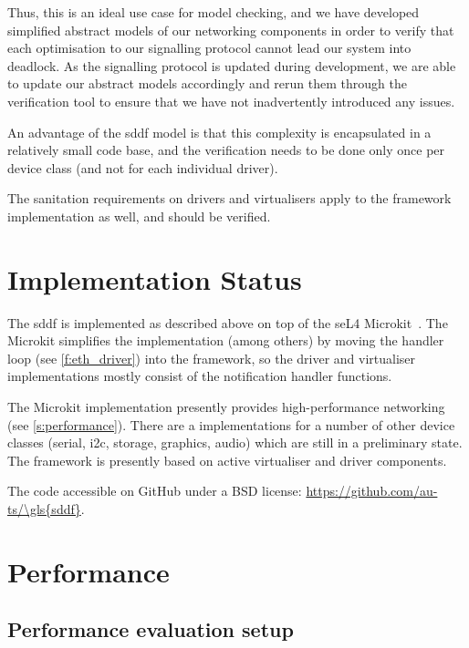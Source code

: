 \documentclass[a4paper,12pt]{report}
\begin{document}
Thus, this is an ideal use case for model checking, and we have developed
simplified abstract models of our networking components in order to verify
that each optimisation to our signalling protocol cannot lead our system into
deadlock. As the signalling protocol is updated during development, we are
able to update our abstract models accordingly and rerun them through the
verification tool to ensure that we have not inadvertently introduced any
issues.

An advantage of the \gls{sddf} model is that this complexity is encapsulated in a
relatively small code base, and the verification needs to be done only
once per device class (and not for each individual driver).

The sanitation requirements on drivers and virtualisers apply to the
framework implementation as well, and should be verified.

\chapter{Implementation Status}\label{s:status}

The \gls{sddf} is implemented as described above on top of the seL4
Microkit~\citep{microkit:url}. The Microkit simplifies the
implementation (among others) by moving the handler loop (see
\autoref{f:eth_driver}) into the framework, so the driver and
virtualiser implementations mostly consist of the notification handler
functions.

The Microkit implementation presently provides high-performance
networking (see \autoref{s:performance}). There are a implementations for a number of other device
classes (serial, \gls{i2c}, storage, graphics, audio) which are still in a
preliminary state. The framework is presently based on active
virtualiser and driver components.

The code accessible on GitHub under a BSD license:
\url{https://github.com/au-ts/\gls{sddf}}.

\chapter{Performance}\label{s:performance}

\section{Performance evaluation setup}
\end{document}
